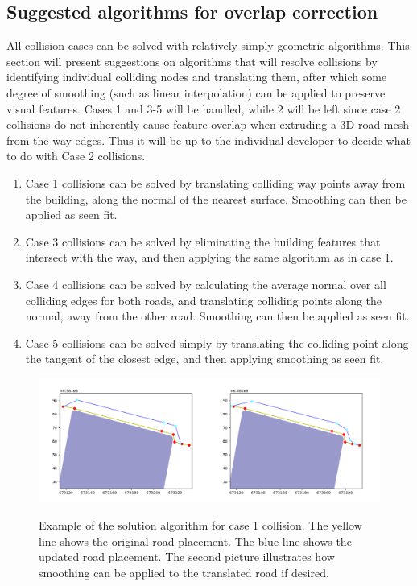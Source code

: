 \documentclass{kththesis}
\begin{document}
\subsection{Suggested algorithms for overlap correction}

All collision cases can be solved with relatively simply geometric algorithms. This section will present suggestions on algorithms that will resolve collisions by identifying individual colliding nodes and translating them, after which some degree of smoothing (such as linear interpolation) can be applied to preserve visual features. Cases 1 and 3-5 will be handled, while 2 will be left since case 2 collisions do not inherently cause feature overlap when extruding a 3D road mesh from the way edges. Thus it will be up to the individual developer to decide what to do with Case 2 collisions.

\begin{enumerate}
\item Case 1 collisions can be solved by translating colliding way points away from the building, along the normal of the nearest surface. Smoothing can then be applied as seen fit.
\item Case 3 collisions can be solved by eliminating the building features that intersect with the way, and then applying the same algorithm as in case 1.
\item Case 4 collisions can be solved by calculating the average normal over all colliding edges for both roads, and translating colliding points along the normal, away from the other road. Smoothing can then be applied as seen fit.
\item Case 5 collisions can be solved simply by translating the colliding point along the tangent of the closest edge, and then applying smoothing as seen fit.
\end{enumerate}

\begin{figure}[H]
    \centering
    \includegraphics[width=\textwidth,height=0.5\textheight,keepaspectratio]{img_feature_overlap_fix_1}
    \label{fig:collision-case-1}
    \caption{Example of the solution algorithm for case 1 collision. The yellow line shows the original road placement. The blue line shows the updated road placement. The second picture illustrates how smoothing can be applied to the translated road if desired.}
\end{figure}
\end{document}
